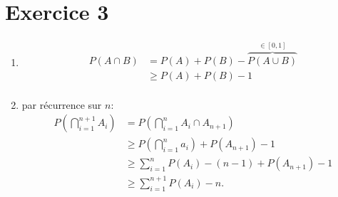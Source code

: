 \part{Exercice 3}

\begin{enumerate}
	\item
		\begin{align*}
			P(A \cap B) &= P(A) + P(B) - \overbrace{P(A \cup B)}^{\in [0,1]}\\
			&\ge P(A) + P(B) - 1 \\
		\end{align*}
	\item par récurrence sur $n$:
		\begin{align*}
			P\left( \bigcap_{i=1}^{n+1} A_i \right) &= P\left( \bigcap_{i=1}^n A_i \cap A_{n+1} \right) \\
			&\ge P\left( \bigcap_{i=1}^n a_i \right) + P(A_{n+1}) - 1\\
			&\ge \sum_{i=1}^n P(A_i) - (n-1) + P(A_{n+1}) - 1\\
			&\ge \sum_{i=1}^{n+1} P(A_i) - n.
		\end{align*}
\end{enumerate}

